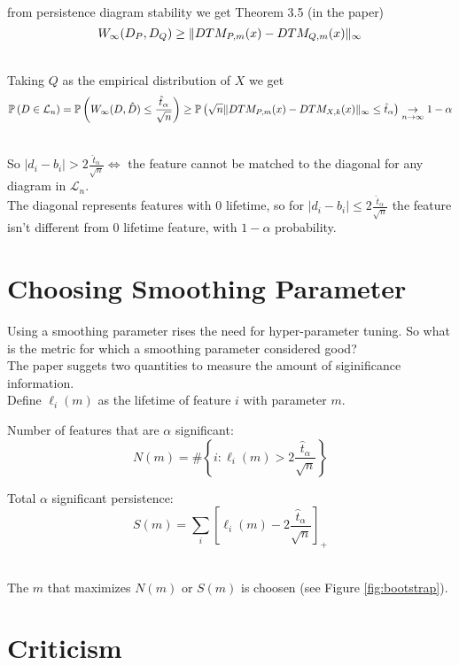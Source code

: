 \documentclass[11pt]{article}
\theoremstyle{definition}
\theoremstyle{definition}
\begin{document}
\text{ }\\
from persistence diagram stability we get Theorem 3.5 (in the paper)
$$W_\infty (D_P,D_Q) \geq \mathopen\| DTM_{P,m}(x) - DTM_{Q,m}(x) \mathclose\|_\infty$$

\text{ }\\
Taking $Q$ as the empirical distribution of $X$ we get
$$\mathbb{P} \left( D \in \mathcal{L}_n \right) = \mathbb{P} \left( W_\infty (D, \hat D) \leq \frac{\hat t_\alpha}{\sqrt{n}} \right) \geq \mathbb{P} \left( \sqrt{n} \mathopen\| DTM_{P,m}(x) - DTM_{X,k}(x) \mathclose\|_\infty \leq \hat t_\alpha \right) \underset{n\rightarrow \infty}{\rightarrow} 1-\alpha$$

\text{ }\\
So $|d_i - b_i| > 2\frac{\hat t_\alpha}{\sqrt{n}} \Leftrightarrow$ the feature cannot be matched to the diagonal for any diagram in $\mathcal{L}_n$.\\
The diagonal represents features with 0 lifetime, so for $|d_i - b_i| \leq 2\frac{\hat t_\alpha}{\sqrt{n}}$ the feature isn't different from 0 lifetime feature, with $1-\alpha$ probability.

\def\tha{\hat t_\alpha}
\def\ftn{2\frac{\tha}{\sqrt{n}}}
\section{Choosing Smoothing Parameter}
Using a smoothing parameter rises the need for hyper-parameter tuning. So what is the metric for which a smoothing parameter considered good?\\
The paper suggets two quantities to measure the amount of siginificance information.\\
Define $\ell_i(m)$ as the lifetime of feature $i$ with parameter $m$.

Number of features that are $\alpha$ significant:
$$N(m) = \# \left\{ i : \ell_i(m) > \ftn \right\}$$

Total $\alpha$ significant persistence:
$$S(m) = \sum_i \left[ \ell_i(m) - \ftn \right]_+$$

\text{ }\\
The $m$ that maximizes $N(m)$ or $S(m)$ is choosen (see Figure \ref{fig:bootstrap}).



\section{Criticism}
\end{document}
